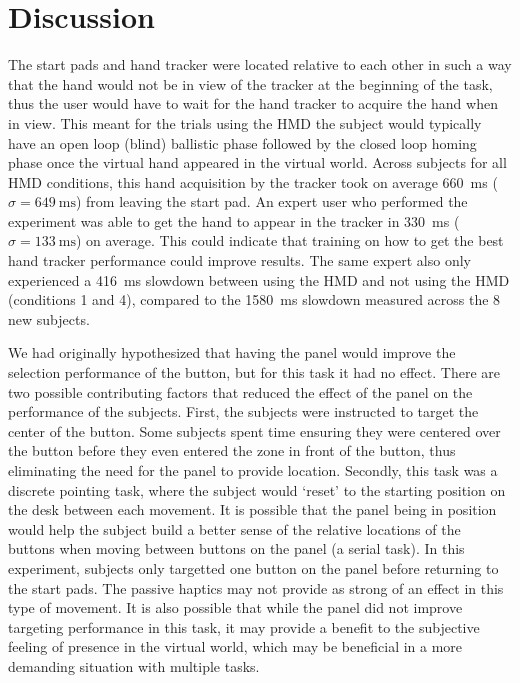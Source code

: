 
\section{Discussion}

The start pads and hand tracker were located relative to each other in such a way that the hand would not be in view of the tracker at the beginning of the task, thus the user would have to wait for the hand tracker to acquire the hand when in view.
This meant for the trials using the HMD the subject would typically have an open loop (blind) ballistic phase followed by the closed loop homing phase once the virtual hand appeared in the virtual world.
Across subjects for all HMD conditions, this hand acquisition by the tracker took on average \SI{660}{\milli\second} ($\sigma = \SI{649}{\milli\second}$) from leaving the start pad.
An expert user who performed the experiment was able to get the hand to appear in the tracker in \SI{330}{\milli\second} ($\sigma = \SI{133}{\milli\second}$) on average.
This could indicate that training on how to get the best hand tracker performance could improve results.
The same expert also only experienced a \SI{416}{\milli\second} slowdown between using the HMD and not using the HMD (conditions 1 and 4), compared to the \SI{1580}{\milli\second} slowdown measured across the 8 new subjects.

We had originally hypothesized that having the panel would improve the selection performance of the button, but for this task it had no effect.
There are two possible contributing factors that reduced the effect of the panel on the performance of the subjects.
First, the subjects were instructed to target the center of the button.
Some subjects spent time ensuring they were centered over the button before they even entered the zone in front of the button, thus eliminating the need for the panel to provide location.
Secondly, this task was a discrete pointing task, where the subject would `reset' to the starting position on the desk between each movement.
It is possible that the panel being in position would help the subject build a better sense of the relative locations of the buttons when moving between buttons on the panel (a serial task).
In this experiment, subjects only targetted one button on the panel before returning to the start pads.
The passive haptics may not provide as strong of an effect in this type of movement.
It is also possible that while the panel did not improve targeting performance in this task, it may provide a benefit to the subjective feeling of presence in the virtual world, which may be beneficial in a more demanding situation with multiple tasks.

